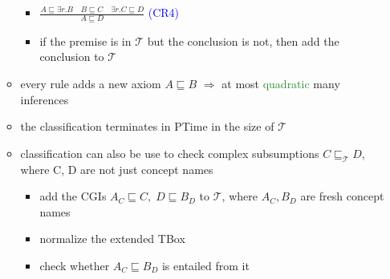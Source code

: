 \documentclass[12pt,a4paper]{article}
\newcommand{\blue}[1]{\textcolor{blue} {#1}}
\newcommand{\green}[1]{\textcolor{ForestGreen} {#1}}
\newcommand{\sse}{\sqsubseteq}
\begin{document}
\begin{itemize}
\begin{itemize}
\begin{itemize}
\item $\displaystyle\frac{A\sse \exists r.B \quad B\sse C \quad \exists r.C \sse D}{A\sse D}$ \blue{(CR4)}
\item if the premise is in $\mathcal{T}$ but the conclusion is not, then add the conclusion to $\mathcal{T}$
\end{itemize}
\item every rule adds a new axiom $A \sse B$ $\Rightarrow$ at most \green{quadratic} many inferences
\item the classification terminates in PTime in the size of $\mathcal{T}$
\item classification can also be use to check complex subsumptions $C \sse_{\mathcal{T}} D$, where C, D are not just concept names
\begin{itemize}
\item add the CGIs $A_C \sse C,\; D\sse B_D$ to $\mathcal{T}$, where $A_C, B_D$ are fresh concept names
\item normalize the extended TBox
\item check whether $A_C \sse B_D$ is entailed from it
\end{itemize}
\end{itemize}
\end{itemize}
\end{document}
